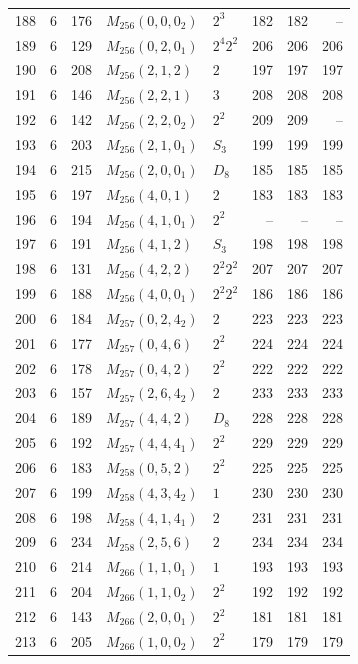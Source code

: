 \documentclass[11pt,a4paper]{article}
\begin{document}
\begin{longtable}{rrr|l|l|rrr}
188 & 6 & 176 & $M_{256}(0,0,0_2)$ & $2^3$ & 182 & 182 & --\\
189 & 6 & 129 & $M_{256}(0,2,0_1)$ & $2^4 2^2$ & 206 & 206 & 206\\
190 & 6 & 208 & $M_{256}(2,1,2)$ & $2$ & 197 & 197 & 197\\
191 & 6 & 146 & $M_{256}(2,2,1)$ & $3$ & 208 & 208 & 208\\
192 & 6 & 142 & $M_{256}(2,2,0_2)$ & $2^2$ & 209 & 209 & --\\
193 & 6 & 203 & $M_{256}(2,1,0_1)$ & $S_3$ & 199 & 199 & 199\\
194 & 6 & 215 & $M_{256}(2,0,0_1)$ & $D_8$ & 185 & 185 & 185\\
195 & 6 & 197 & $M_{256}(4,0,1)$ & $2$ & 183 & 183 & 183\\
196 & 6 & 194 & $M_{256}(4,1,0_1)$ & $2^2$ & -- & -- & --\\
197 & 6 & 191 & $M_{256}(4,1,2)$ & $S_3$ & 198 & 198 & 198\\
198 & 6 & 131 & $M_{256}(4,2,2)$ & $2^2 2^2$ & 207 & 207 & 207\\
199 & 6 & 188 & $M_{256}(4,0,0_1)$ & $2^2 2^2$ & 186 & 186 & 186\\
200 & 6 & 184 & $M_{257}(0,2,4_2)$ & $2$ & 223 & 223 & 223\\
201 & 6 & 177 & $M_{257}(0,4,6)$ & $2^2$ & 224 & 224 & 224\\
202 & 6 & 178 & $M_{257}(0,4,2)$ & $2^2$ & 222 & 222 & 222\\
203 & 6 & 157 & $M_{257}(2,6,4_2)$ & $2$ & 233 & 233 & 233\\
204 & 6 & 189 & $M_{257}(4,4,2)$ & $D_8$ & 228 & 228 & 228\\
205 & 6 & 192 & $M_{257}(4,4,4_1)$ & $2^2$ & 229 & 229 & 229\\
206 & 6 & 183 & $M_{258}(0,5,2)$ & $2^2$ & 225 & 225 & 225\\
207 & 6 & 199 & $M_{258}(4,3,4_2)$ & $1$ & 230 & 230 & 230\\
208 & 6 & 198 & $M_{258}(4,1,4_1)$ & $2$ & 231 & 231 & 231\\
209 & 6 & 234 & $M_{258}(2,5,6)$ & $2$ & 234 & 234 & 234\\
210 & 6 & 214 & $M_{266}(1,1,0_1)$ & $1$ & 193 & 193 & 193\\
211 & 6 & 204 & $M_{266}(1,1,0_2)$ & $2^2$ & 192 & 192 & 192\\
212 & 6 & 143 & $M_{266}(2,0,0_1)$ & $2^2$ & 181 & 181 & 181\\
213 & 6 & 205 & $M_{266}(1,0,0_2)$ & $2^2$ & 179 & 179 & 179\\

\end{longtable}
\end{document}
